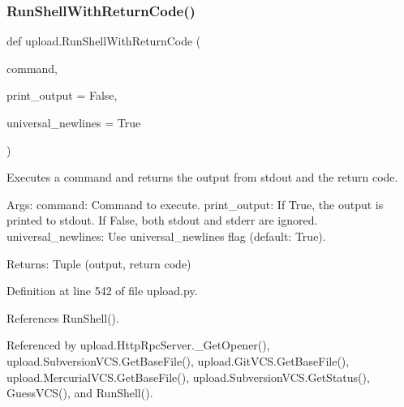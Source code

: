 \subsubsection{\texorpdfstring{Run\+Shell\+With\+Return\+Code()}{RunShellWithReturnCode()}}
{\footnotesize\ttfamily def upload.\+Run\+Shell\+With\+Return\+Code (\begin{DoxyParamCaption}\item[{}]{command,  }\item[{}]{print\+\_\+output = {\ttfamily False},  }\item[{}]{universal\+\_\+newlines = {\ttfamily True} }\end{DoxyParamCaption})}

\begin{DoxyVerb}Executes a command and returns the output from stdout and the return code.

Args:
  command: Command to execute.
  print_output: If True, the output is printed to stdout.
                If False, both stdout and stderr are ignored.
  universal_newlines: Use universal_newlines flag (default: True).

Returns:
  Tuple (output, return code)
\end{DoxyVerb}
 

Definition at line 542 of file upload.\+py.



References Run\+Shell().



Referenced by upload.\+Http\+Rpc\+Server.\+\_\+\+Get\+Opener(), upload.\+Subversion\+V\+C\+S.\+Get\+Base\+File(), upload.\+Git\+V\+C\+S.\+Get\+Base\+File(), upload.\+Mercurial\+V\+C\+S.\+Get\+Base\+File(), upload.\+Subversion\+V\+C\+S.\+Get\+Status(), Guess\+V\+C\+S(), and Run\+Shell().


